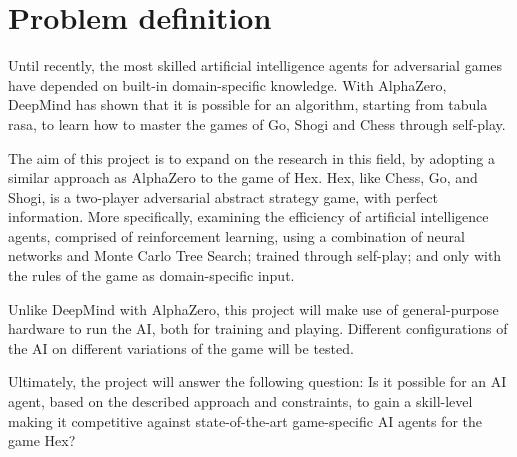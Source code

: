 \section{Problem definition}
Until recently, the most skilled artificial intelligence agents for adversarial games have depended on built-in domain-specific knowledge. With AlphaZero, DeepMind has shown that it is possible for an algorithm, starting from tabula rasa, to learn how to master the games of Go, Shogi and Chess through self-play\cite{Silver2018}.

The aim of this project is to expand on the research in this field, by adopting a similar approach as AlphaZero to the game of Hex. Hex, like Chess, Go, and Shogi, is a two-player adversarial abstract strategy game, with perfect information. More specifically, examining the efficiency of artificial intelligence agents, comprised of reinforcement learning, using a combination of neural networks and Monte Carlo Tree Search; trained through self-play; and only with the rules of the game as domain-specific input.

Unlike DeepMind with AlphaZero, this project will make use of general-purpose hardware to run the AI, both for training and playing. Different configurations of the AI on different variations of the game will be tested.

Ultimately, the project will answer the following question: Is it possible for an AI agent, based on the described approach and constraints, to gain a skill-level making it competitive against state-of-the-art game-specific AI agents for the game Hex?
